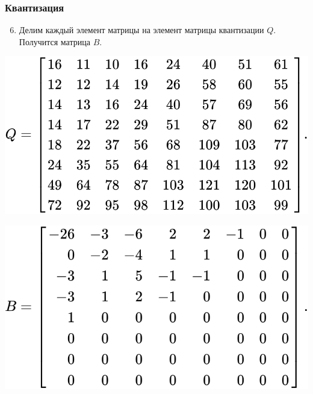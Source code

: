 \documentclass[10pt,pdf,hyperref={unicode}]{beamer}
\begin{document}
\begin{frame}[fragile]
\frametitle{Квантизация} 
\begin{enumerate}
\setcounter{enumi}{5}
\item Делим каждый элемент матрицы на элемент матрицы квантизации $Q$.
Получится матрица $B$.
\end{enumerate}
\begin{center}
\includegraphics[scale=0.26]{./images/matrix2.png}
\end{center}

\begin{center}
\includegraphics[scale=0.26]{./images/matrix3.png}
\end{center}
\end{frame}
\end{document}
